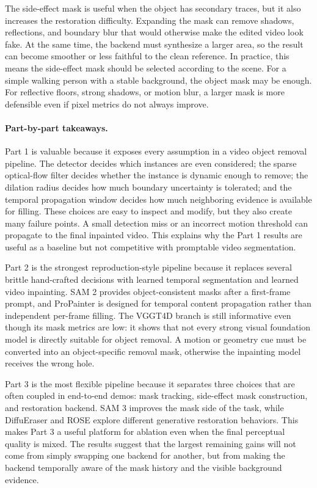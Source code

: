 \documentclass[10pt,twocolumn,letterpaper]{article}
\begin{document}
The side-effect mask is useful when the object has secondary traces, but it also increases the restoration difficulty. Expanding the mask can remove shadows, reflections, and boundary blur that would otherwise make the edited video look fake. At the same time, the backend must synthesize a larger area, so the result can become smoother or less faithful to the clean reference. In practice, this means the side-effect mask should be selected according to the scene. For a simple walking person with a stable background, the object mask may be enough. For reflective floors, strong shadows, or motion blur, a larger mask is more defensible even if pixel metrics do not always improve.

\paragraph{Part-by-part takeaways.}
Part 1 is valuable because it exposes every assumption in a video object removal pipeline. The detector decides which instances are even considered; the sparse optical-flow filter decides whether the instance is dynamic enough to remove; the dilation radius decides how much boundary uncertainty is tolerated; and the temporal propagation window decides how much neighboring evidence is available for filling. These choices are easy to inspect and modify, but they also create many failure points. A small detection miss or an incorrect motion threshold can propagate to the final inpainted video. This explains why the Part 1 results are useful as a baseline but not competitive with promptable video segmentation.

Part 2 is the strongest reproduction-style pipeline because it replaces several brittle hand-crafted decisions with learned temporal segmentation and learned video inpainting. SAM 2 provides object-consistent masks after a first-frame prompt, and ProPainter is designed for temporal content propagation rather than independent per-frame filling. The VGGT4D branch is still informative even though its mask metrics are low: it shows that not every strong visual foundation model is directly suitable for object removal. A motion or geometry cue must be converted into an object-specific removal mask, otherwise the inpainting model receives the wrong hole.

Part 3 is the most flexible pipeline because it separates three choices that are often coupled in end-to-end demos: mask tracking, side-effect mask construction, and restoration backend. SAM 3 improves the mask side of the task, while DiffuEraser and ROSE explore different generative restoration behaviors. This makes Part 3 a useful platform for ablation even when the final perceptual quality is mixed. The results suggest that the largest remaining gains will not come from simply swapping one backend for another, but from making the backend temporally aware of the mask history and the visible background evidence.
\end{document}
